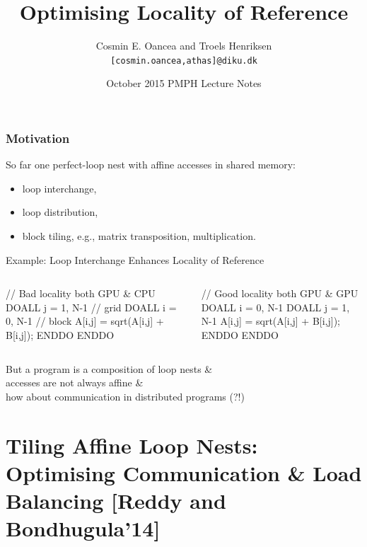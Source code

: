 \documentclass{beamer}
\title[Locality]{Optimising Locality of Reference}
\author[C.~Oancea]{Cosmin E. Oancea and Troels Henriksen\\{\tt [cosmin.oancea,athas]@diku.dk}}
\institute{Department of Computer Science (DIKU)\\University of Copenhagen}
\date[Oct 2015]{October 2015 PMPH Lecture Notes}
\newcommand{\emphh}[1]{\textcolor{CosGreen}{ #1}}
\begin{document}
\titleslide




\begin{frame}[fragile,t]
  \frametitle{Motivation}

\emphh{So far one perfect-loop nest with affine accesses in shared memory}:
\begin{itemize}
    \item loop interchange,
    \item loop distribution,
    \item block tiling, e.g., matrix transposition, multiplication.
\end  {itemize}\bigskip

\begin{block}{Example: Loop Interchange Enhances Locality of Reference}
\begin{columns}
\begin{colorcode}
// Bad locality both GPU \& CPU
\emphh{DOALL j = 1, N-1} // grid
  \emphh{DOALL i = 0, N-1} // block
    A[i,j] = sqrt(A[i,j] + B[i,j]);
  ENDDO
ENDDO
\end{colorcode}
\begin{colorcode}
// Good locality both GPU \& GPU
\emphh{DOALL i = 0, N-1}
  \emphh{DOALL j = 1, N-1}    
    A[i,j] = sqrt(A[i,j] + B[i,j]);
  ENDDO
ENDDO
\end{colorcode}
\end{columns}
\end{block} 
 
\alert{But a program is a composition of loop nests \&\\ 
accesses are not always affine \&\\
how about communication in distributed programs (?!)}

\end{frame}


\begin{frame}[fragile]
	\tableofcontents
\end{frame}

\section{Tiling Affine Loop Nests: Optimising Communication \& Load Balancing [Reddy and Bondhugula'14]}
\end{document}
